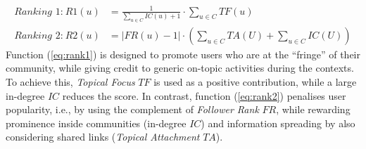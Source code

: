 \begin{align}
\textit{Ranking 1:} ~ \mathit{R1}(u) & = \frac{1}{\sum_{u \in C} \mathit{IC}(u) + 1} \cdot \sum_{u \in C} \mathit{TF}(u) \label{eq:rank1} \\
\textit{Ranking 2:} ~ \mathit{R2}(u) & = \lvert \mathit{FR}(u) - 1 \rvert \cdot \left(\sum_{u \in C} \mathit{TA}(U) + \sum_{u \in C} \mathit{IC}(U)\right) \label{eq:rank2}
\end{align}
%
Function (\ref{eq:rank1}) is designed to promote users who are at the ``fringe'' of their community, while giving credit to generic on-topic activities during the contexts. 
To achieve this, \textit{Topical Focus} $\mathit{TF}$ is used as a positive contribution, while a large in-degree $\mathit{IC}$ reduces the score.
%
In contrast, function (\ref{eq:rank2}) penalises user popularity, i.e., by using the complement of \textit{Follower Rank} $\mathit{FR}$, while rewarding prominence inside communities (in-degree $\mathit{IC}$) and information spreading by also considering shared links (\textit{Topical Attachment} $\mathit{TA}$).

